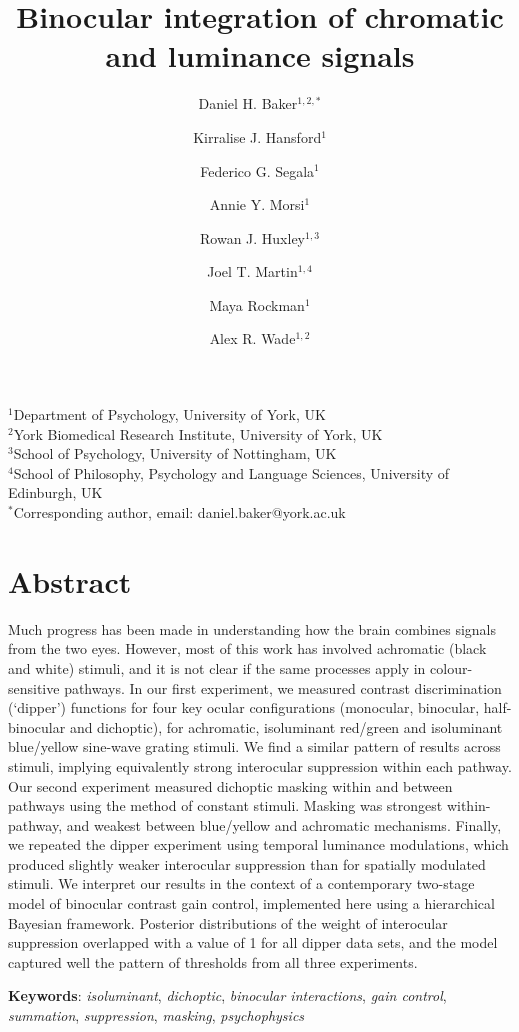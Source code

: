 \documentclass[
  letterpaper,
  DIV=11,
  numbers=noendperiod]{scrartcl}
\title{Binocular integration of chromatic and luminance signals}
\author{Daniel H. Baker\(^{1,2,*}\) \and Kirralise J.
Hansford\(^1\) \and Federico G. Segala\(^1\) \and Annie Y.
Morsi\(^1\) \and Rowan J. Huxley\(^{1,3}\) \and Joel T.
Martin\(^{1,4}\) \and Maya Rockman\(^1\) \and Alex R. Wade\(^{1,2}\)}
\date{}
\begin{document}
\maketitle
\(^1\)Department of Psychology, University of York, UK\\
\(^2\)York Biomedical Research Institute, University of York, UK\\
\(^3\)School of Psychology, University of Nottingham, UK\\
\(^4\)School of Philosophy, Psychology and Language Sciences, University
of Edinburgh, UK\\
\(^*\)Corresponding author, email: daniel.baker@york.ac.uk

\hypertarget{abstract}{%
\section{Abstract}\label{abstract}}

Much progress has been made in understanding how the brain combines
signals from the two eyes. However, most of this work has involved
achromatic (black and white) stimuli, and it is not clear if the same
processes apply in colour-sensitive pathways. In our first experiment,
we measured contrast discrimination (`dipper') functions for four key
ocular configurations (monocular, binocular, half-binocular and
dichoptic), for achromatic, isoluminant red/green and isoluminant
blue/yellow sine-wave grating stimuli. We find a similar pattern of
results across stimuli, implying equivalently strong interocular
suppression within each pathway. Our second experiment measured
dichoptic masking within and between pathways using the method of
constant stimuli. Masking was strongest within-pathway, and weakest
between blue/yellow and achromatic mechanisms. Finally, we repeated the
dipper experiment using temporal luminance modulations, which produced
slightly weaker interocular suppression than for spatially modulated
stimuli. We interpret our results in the context of a contemporary
two-stage model of binocular contrast gain control, implemented here
using a hierarchical Bayesian framework. Posterior distributions of the
weight of interocular suppression overlapped with a value of 1 for all
dipper data sets, and the model captured well the pattern of thresholds
from all three experiments.

\textbf{Keywords}: \emph{isoluminant}, \emph{dichoptic}, \emph{binocular
interactions}, \emph{gain control}, \emph{summation},
\emph{suppression}, \emph{masking}, \emph{psychophysics}
\end{document}
